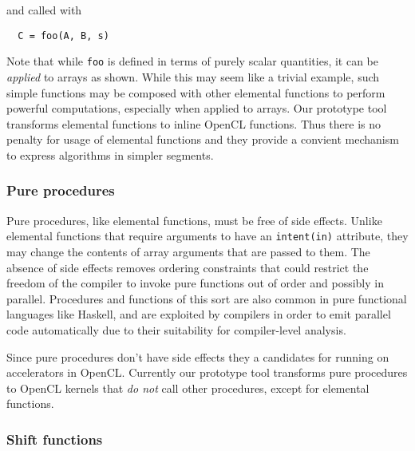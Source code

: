 \noindent and called with

{\small
\begin{verbatim}
  C = foo(A, B, s)
\end{verbatim}
}

Note that while {\tt foo} is defined in terms of purely scalar
quantities, it can be \emph{applied} to arrays as shown.  While this
may seem like a trivial example, such simple functions may be composed
with other elemental functions to perform powerful computations,
especially when applied to arrays.  Our prototype tool transforms
elemental functions to inline OpenCL functions.  Thus there is no
penalty for usage of elemental functions and they provide a convient
mechanism to express algorithms in simpler segments.


\subsubsection*{Pure procedures}

Pure procedures, like elemental functions, must be free of side
effects.  Unlike elemental functions that require arguments to have an
{\tt intent(in)} attribute, they may change the contents of array
arguments that are passed to them.  The absence of side effects
removes ordering constraints that could restrict the freedom of the
compiler to invoke pure functions out of order and possibly in parallel.
Procedures and functions of this sort are also common in pure
functional languages like Haskell, and are exploited by compilers in
order to emit parallel code automatically due to their suitability for
compiler-level analysis.

Since pure procedures don't have side effects they a candidates for
running on accelerators in OpenCL.  Currently our prototype tool
transforms pure procedures to OpenCL kernels that \emph{do not} call
other procedures, except for elemental functions.

\subsubsection*{Shift functions}

